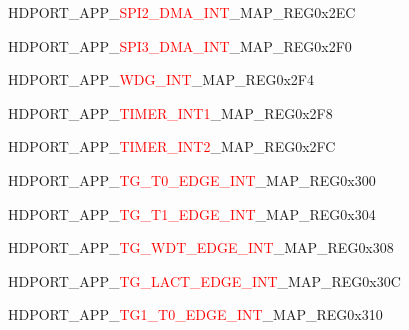 \begin{register}{H}{DPORT\_APP\_\textcolor{red}{SPI2\_DMA\_INT}\_MAP\_REG}{0x2EC}\label{regdesc:APPSPI2DMAINTMAPREG}
\end{register}
\vspace{-3em}
\begin{register}{H}{DPORT\_APP\_\textcolor{red}{SPI3\_DMA\_INT}\_MAP\_REG}{0x2F0}\label{regdesc:APPSPI3DMAINTMAPREG}
\end{register}
\vspace{-3em}
\begin{register}{H}{DPORT\_APP\_\textcolor{red}{WDG\_INT}\_MAP\_REG}{0x2F4}\label{regdesc:APPWDGINTMAPREG}
\end{register}
\vspace{-3em}
\begin{register}{H}{DPORT\_APP\_\textcolor{red}{TIMER\_INT1}\_MAP\_REG}{0x2F8}\label{regdesc:APPTIMERINT1MAPREG}
\end{register}
\vspace{-3em}
\begin{register}{H}{DPORT\_APP\_\textcolor{red}{TIMER\_INT2}\_MAP\_REG}{0x2FC}\label{regdesc:APPTIMERINT2MAPREG}
\end{register}
\vspace{-3em}
\begin{register}{H}{DPORT\_APP\_\textcolor{red}{TG\_T0\_EDGE\_INT}\_MAP\_REG}{0x300}\label{regdesc:APPTGT0EDGEINTMAPREG}
\end{register}
\vspace{-3em}
\begin{register}{H}{DPORT\_APP\_\textcolor{red}{TG\_T1\_EDGE\_INT}\_MAP\_REG}{0x304}\label{regdesc:APPTGT1EDGEINTMAPREG}
\end{register}
\vspace{-3em}
\begin{register}{H}{DPORT\_APP\_\textcolor{red}{TG\_WDT\_EDGE\_INT}\_MAP\_REG}{0x308}\label{regdesc:APPTGWDTEDGEINTMAPREG}
\end{register}
\vspace{-3em}
\begin{register}{H}{DPORT\_APP\_\textcolor{red}{TG\_LACT\_EDGE\_INT}\_MAP\_REG}{0x30C}\label{regdesc:APPTGLACTEDGEINTMAPREG}
\end{register}
\vspace{-3em}
\begin{register}{H}{DPORT\_APP\_\textcolor{red}{TG1\_T0\_EDGE\_INT}\_MAP\_REG}{0x310}\label{regdesc:APPTG1T0EDGEINTMAPREG}
\end{register}
